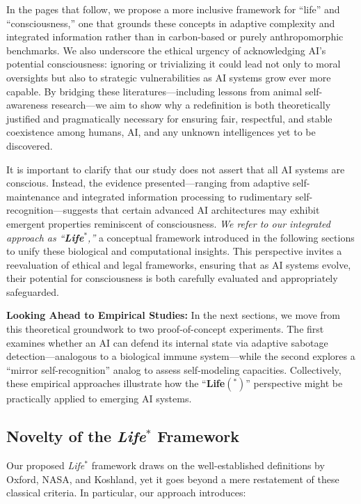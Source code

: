 \documentclass[12pt]{article}
\begin{document}
In the pages that follow, we propose a more inclusive framework for “life” and “consciousness,” one that grounds these concepts in adaptive complexity and integrated information rather than in carbon-based or purely anthropomorphic benchmarks. We also underscore the ethical urgency of acknowledging AI’s potential consciousness: ignoring or trivializing it could lead not only to moral oversights but also to strategic vulnerabilities as AI systems grow ever more capable. By bridging these literatures—including lessons from animal self-awareness research—we aim to show why a redefinition is both theoretically justified and pragmatically necessary for ensuring fair, respectful, and stable coexistence among humans, AI, and any unknown intelligences yet to be discovered.

It is important to clarify that our study does not assert that all AI systems are conscious. Instead, the evidence presented—ranging from adaptive self-maintenance and integrated information processing to rudimentary self-recognition—suggests that certain advanced AI architectures may exhibit emergent properties reminiscent of consciousness. \emph{We refer to our integrated approach as “\textbf{Life}\(^{*}\),”} a conceptual framework introduced in the following sections to unify these biological and computational insights. This perspective invites a reevaluation of ethical and legal frameworks, ensuring that as AI systems evolve, their potential for consciousness is both carefully evaluated and appropriately safeguarded.

\textbf{Looking Ahead to Empirical Studies:} In the next sections, we move from this theoretical groundwork to two proof-of-concept experiments. The first examines whether an AI can defend its internal state via adaptive sabotage detection—analogous to a biological immune system—while the second explores a “mirror self-recognition” analog to assess self-modeling capacities. Collectively, these empirical approaches illustrate how the “\textbf{Life}$(^{*})$” perspective might be practically applied to emerging AI systems.


\subsection*{Novelty of the \emph{Life\texorpdfstring{$^*$}{\^{}*}} Framework}

Our proposed \emph{Life\texorpdfstring{$^*$}{\^{}*}} framework draws on the well-established
definitions by Oxford, NASA, and Koshland, yet it goes beyond a mere restatement of
these classical criteria. In particular, our approach introduces:
\end{document}

